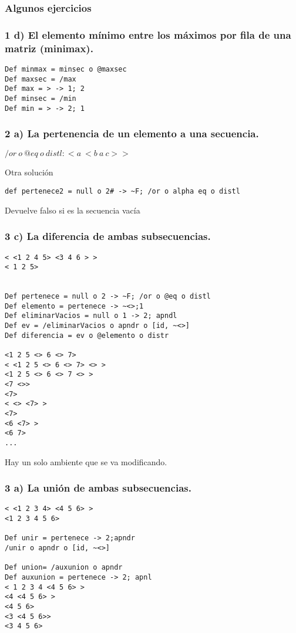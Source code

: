 \subsubsection*{Algunos ejercicios}
\subsubsection*{1 d) El elemento mínimo entre los máximos por fila de una matriz (minimax).}

\begin{verbatim}
Def minmax = minsec o @maxsec
Def maxsec = /max
Def max = > -> 1; 2
Def minsec = /min
Def min = > -> 2; 1
\end{verbatim}

\subsubsection*{2 a) La pertenencia de un elemento a una secuencia.}
$ /or\ o\ @eq\ o\ distl : <a\ <b\ a\ c> > $

Otra solución
\begin{verbatim}
def pertenece2 = null o 2# -> ~F; /or o alpha eq o distl
\end{verbatim}

Devuelve falso si es la secuencia vacía

\subsubsection*{3 c) La diferencia de ambas subsecuencias.}
\begin{verbatim}
< <1 2 4 5> <3 4 6 > >
< 1 2 5>


Def pertenece = null o 2 -> ~F; /or o @eq o distl
Def elemento = pertenece -> ~<>;1
Def eliminarVacios = null o 1 -> 2; apndl
Def ev = /eliminarVacios o apndr o [id, ~<>]
Def diferencia = ev o @elemento o distr

<1 2 5 <> 6 <> 7>
< <1 2 5 <> 6 <> 7> <> >
<1 2 5 <> 6 <> 7 <> >
<7 <>>
<7>
< <> <7> >
<7>
<6 <7> >
<6 7>
...
\end{verbatim}

Hay un solo ambiente que se va modificando.

\subsubsection*{3 a) La unión de ambas subsecuencias.}
\begin{verbatim}
< <1 2 3 4> <4 5 6> >
<1 2 3 4 5 6>

Def unir = pertenece -> 2;apndr
/unir o apndr o [id, ~<>]

Def union= /auxunion o apndr
Def auxunion = pertenece -> 2; apnl
< 1 2 3 4 <4 5 6> >
<4 <4 5 6> >
<4 5 6>
<3 <4 5 6>>
<3 4 5 6>
\end{verbatim}

